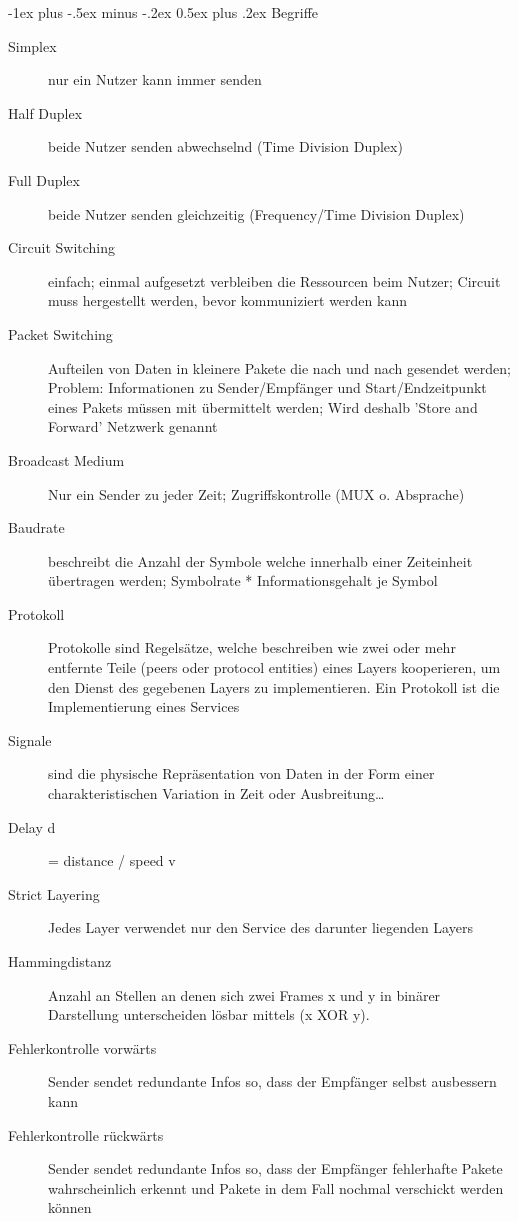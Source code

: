 \documentclass[10pt,landscape]{article}
\makeatletter
\renewcommand{\section}{\@startsection{section}{1}{0mm}%
                                {-1ex plus -.5ex minus -.2ex}%
                                {0.5ex plus .2ex}%
                                {\normalfont\large\bfseries}}
\makeatother
\begin{document}
\begin{multicols}{3}
\newpage
\section{Begriffe}
\begin{description}
    \item[Simplex] nur ein Nutzer kann immer senden
    \item[Half Duplex] beide Nutzer senden abwechselnd (Time Division Duplex)
    \item[Full Duplex] beide Nutzer senden gleichzeitig (Frequency/Time Division Duplex)
    \item[Circuit Switching] einfach; einmal aufgesetzt verbleiben die Ressourcen beim Nutzer; Circuit muss hergestellt werden, bevor kommuniziert werden kann
    \item[Packet Switching] Aufteilen von Daten in kleinere Pakete die nach und nach gesendet werden; Problem: Informationen zu Sender/Empfänger und Start/Endzeitpunkt eines Pakets müssen mit übermittelt werden; Wird deshalb 'Store and Forward' Netzwerk genannt
    \item[Broadcast Medium] Nur ein Sender zu jeder Zeit; Zugriffskontrolle (MUX o. Absprache)
    \item[Baudrate] beschreibt die Anzahl der Symbole welche innerhalb einer Zeiteinheit übertragen werden; Symbolrate * Informationsgehalt je Symbol
    \item[Protokoll] Protokolle sind Regelsätze, welche beschreiben wie zwei oder mehr entfernte Teile (peers oder protocol entities) eines Layers kooperieren, um den Dienst des gegebenen Layers zu implementieren. Ein Protokoll ist die Implementierung eines Services
    \item[Signale] sind die physische Repräsentation von Daten in der Form einer charakteristischen Variation in Zeit oder Ausbreitung…
    \item[Delay d] = distance / speed v
    \item[Strict Layering] Jedes Layer verwendet nur den Service des darunter liegenden Layers
    \item[Hammingdistanz] Anzahl an Stellen an denen sich zwei Frames x und y in binärer Darstellung unterscheiden lösbar mittels (x XOR y). 
    \item[Fehlerkontrolle vorwärts] Sender sendet redundante Infos so, dass der Empfänger selbst ausbessern kann
    \item[Fehlerkontrolle rückwärts] Sender sendet redundante Infos so, dass der Empfänger fehlerhafte Pakete wahrscheinlich erkennt und Pakete in dem Fall nochmal verschickt werden können

\end{description}
\end{multicols}
\end{document}
